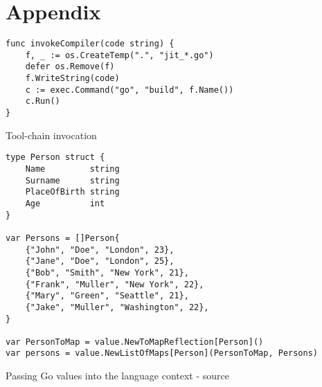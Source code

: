 \chapter{Appendix}


\begin{listing}[H]
    \begin{verbatim}
func invokeCompiler(code string) {
    f, _ := os.CreateTemp(".", "jit_*.go")
    defer os.Remove(f)
    f.WriteString(code)
    c := exec.Command("go", "build", f.Name())
    c.Run()
}
    \end{verbatim}
    \caption{Tool-chain invocation}
    \label{code:compiler_invocation}
\end{listing}

\begin{listing}[H]
    \begin{verbatim}
type Person struct {
	Name         string
	Surname      string
	PlaceOfBirth string
	Age          int
}

var Persons = []Person{
	{"John", "Doe", "London", 23},
	{"Jane", "Doe", "London", 25},
	{"Bob", "Smith", "New York", 21},
	{"Frank", "Muller", "New York", 22},
	{"Mary", "Green", "Seattle", 21},
	{"Jake", "Muller", "Washington", 22},
}

var PersonToMap = value.NewToMapReflection[Person]()
var persons = value.NewListOfMaps[Person](PersonToMap, Persons)
    \end{verbatim}
    \caption{Passing Go values into the language context - source \cite{parser2_xnacly}}
    \label{code:go-to-language-interop}
\end{listing}
